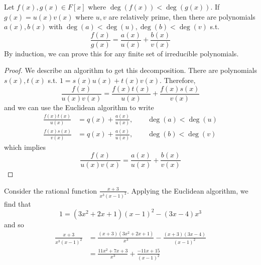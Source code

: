   \begin{theorem}
    Let $f(x), g(x) \in F[x]$ where $\deg(f(x)) < \deg(g(x))$. If $g(x) = u(x) v(x)$ where $u, v$ are relatively prime, then there are polynomials $a(x), b(x)$ with $\deg(a) < \deg(u), \deg(b) < \deg(v)$ s.t. 
    \begin{equation}
      \frac{f(x)}{g(x)} = \frac{a(x)}{u(x)} + \frac{b(x)}{v(x)}
    \end{equation}
    By induction, we can prove this for any finite set of irreducible polynomials. 
  \end{theorem}
  \begin{proof}
    We describe an algorithm to get this decomposition. There are polynomials $s(x), t(x)$ s.t. $1 = s(x) u(x) + t(x) v(x)$. Therefore, 
    \begin{equation}
      \frac{f(x)}{ u(x) v(x)} = \frac{f(x) t(x)}{u(x)} + \frac{f(x) s(x)}{v(x)}
    \end{equation}
    and we can use the Euclidean algorithm to write 
    \begin{align}
      \frac{f(x) t(x)}{u(x)} & = q(x) + \frac{a(x)}{u(x)}, \qquad \deg(a) < \deg(u) \\
      \frac{f(x) s(x)}{v(x)} & = q(x) + \frac{a(x)}{u(x)}, \qquad \deg(b) < \deg(v)
    \end{align}
    which implies 
    \begin{equation}
      \frac{f(x)}{u(x) v(x)} = \frac{a(x)}{u(x)} + \frac{b(x)}{v(x)}
    \end{equation}
  \end{proof}

  \begin{example}
    Consider the rational function $\frac{x + 3}{x^3 (x - 1)^2}$. Applying the Euclidean algorithm, we find that 
    \begin{equation}
      1 = (3x^2 + 2x + 1) (x - 1)^2 - (3x - 4) x^3
    \end{equation}
    and so 
    \begin{align}
      \frac{x + 3}{x^3 (x - 1)^2} & = \frac{(x + 3)(3x^2 + 2x + 1)}{x^3} - \frac{(x + 3)(3x - 4)}{(x - 1)^2} \\
                                  & = \frac{11x^2 + 7x + 3}{x^3} + \frac{-11x + 15}{(x - 1)^2}
    \end{align}
  \end{example}
